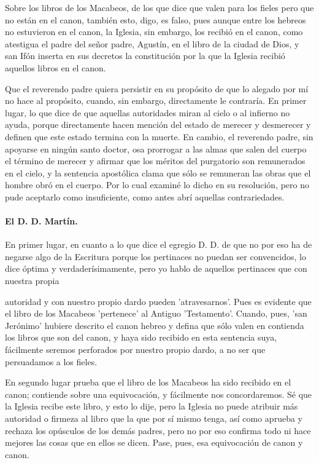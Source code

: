 Sobre los libros de los Macabeos, de los que dice que valen para los fieles pero que no están en el canon, también esto, digo, es falso, pues aunque entre los hebreos no estuvieron en el canon, la Iglesia, sin embargo, los recibió en el canon, como atestigua el padre del señor padre, Agustín, en el libro de la ciudad de Dios, y san Ifón inserta en sus decretos la constitución por la que la Iglesia recibió aquellos libros en el canon.

Que el reverendo padre quiera persistir en su propósito de que lo alegado por mí no hace al propósito, cuando, sin embargo, directamente le contraría. En primer lugar, lo que dice de que aquellas autoridades miran al cielo o al infierno no ayuda, porque directamente hacen mención del estado de merecer y desmerecer y definen que este \marginpar{\small[325]} estado termina con la muerte. En cambio, el reverendo padre, sin apoyarse en ningún santo doctor, osa prorrogar a las almas que salen del cuerpo el término de merecer y afirmar que los méritos del purgatorio son remunerados en el cielo, y la sentencia apostólica clama que sólo se remuneran las obras que el hombre obró en el cuerpo. Por lo cual examiné lo dicho en su resolución, pero no pude aceptarlo como insuficiente, como antes abrí aquellas contrariedades.

\paragraph*{El D. D. Martín.}

En primer lugar, en cuanto a lo que dice el egregio D. D. de que no por eso ha de negarse algo de la Escritura porque los pertinaces no puedan ser convencidos, lo dice óptima y verdaderísimamente, pero yo hablo de aquellos pertinaces que con nuestra propia

autoridad y con nuestro propio dardo pueden 'atravesarnos'. Pues es evidente que el libro de los Macabeos 'pertenece' al Antiguo 'Testamento'. Cuando, pues, 'san Jerónimo' hubiere descrito el canon hebreo y defina que sólo valen en contienda los libros que son del canon, y haya sido recibido en esta sentencia suya, fácilmente seremos perforados por nuestro propio dardo, a no ser que persuadamos a los fieles.

En segundo lugar prueba que el libro de los Macabeos ha sido recibido en el canon; contiende sobre una equivocación, y fácilmente nos concordaremos. Sé que la Iglesia recibe este libro, y esto lo dije, pero la Iglesia no puede atribuir más autoridad o firmeza al libro que la que por sí mismo tenga, así como aprueba y rechaza los opúsculos de los demás padres, pero no por eso confirma todo ni hace mejores las cosas que en ellos se dicen. Pase, pues, esa equivocación de canon y canon.

